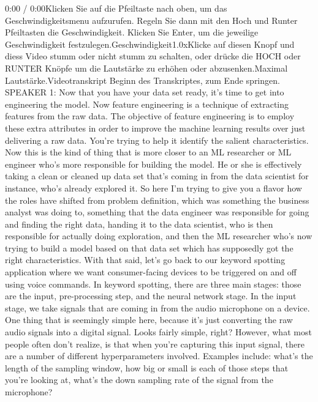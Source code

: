     0:00 / 0:00Klicken Sie auf die Pfeiltaste nach oben, um das Geschwindigkeitsmenu aufzurufen. Regeln Sie dann mit den Hoch und Runter Pfeiltasten die Geschwindigkeit. Klicken Sie Enter, um die jeweilige Geschwindigkeit festzulegen.Geschwindigkeit1.0xKlicke auf diesen Knopf und diess Video stumm oder nicht stumm zu schalten, oder drücke die HOCH oder RUNTER Knöpfe um die Lautstärke zu erhöhen oder abzusenken.Maximal Lautstärke.Videotranskript
    Beginn des Transkriptes, zum Ende springen.
    SPEAKER 1: Now that you have your data set ready,
    it's time to get into engineering the model.
    Now feature engineering is a technique of extracting features
    from the raw data.
    The objective of feature engineering is to employ these extra attributes
    in order to improve the machine learning results
    over just delivering a raw data.
    You're trying to help it identify the salient characteristics.
    Now this is the kind of thing that is more closer to an ML researcher or ML
    engineer who's more responsible for building the model.
    He or she is effectively taking a clean or cleaned up
    data set that's coming in from the data scientist for instance,
    who's already explored it.
    So here I'm trying to give you a flavor how the roles have shifted
    from problem definition, which was something the business analyst was
    doing to, something that the data engineer was responsible for going
    and finding the right data, handing it to the data scientist, who is then
    responsible for actually doing exploration,
    and then the ML researcher who's now trying
    to build a model based on that data set which has supposedly
    got the right characteristics.
    With that said, let's go back to our keyword spotting application
    where we want consumer-facing devices to be triggered
    on and off using voice commands.
    In keyword spotting, there are three main stages:
    those are the input, pre-processing step, and the neural network stage.
    In the input stage, we take signals that are
    coming in from the audio microphone on a device.
    One thing that is seemingly simple here, because it's just
    converting the raw audio signals into a digital signal.
    Looks fairly simple, right?
    However, what most people often don't realize,
    is that when you're capturing this input signal,
    there are a number of different hyperparameters involved.
    Examples include: what's the length of the sampling window, how
    big or small is each of those steps that you're looking at,
    what's the down sampling rate of the signal from the microphone?
